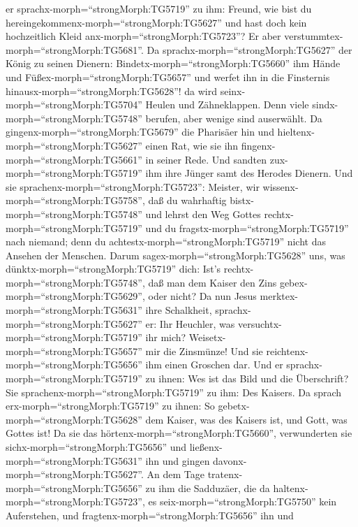 er sprachx-morph=``strongMorph:TG5719'' zu ihm: Freund, wie bist du
hereingekommenx-morph=``strongMorph:TG5627'' und hast doch kein
hochzeitlich Kleid anx-morph=``strongMorph:TG5723''? Er aber
verstummtex-morph=``strongMorph:TG5681''.  Da
sprachx-morph=``strongMorph:TG5627'' der König zu seinen Dienern:
Bindetx-morph=``strongMorph:TG5660'' ihm Hände und
Füßex-morph=``strongMorph:TG5657'' und werfet ihn in die Finsternis
hinausx-morph=``strongMorph:TG5628''! da wird
seinx-morph=``strongMorph:TG5704'' Heulen und Zähneklappen.
 Denn viele sindx-morph=``strongMorph:TG5748'' berufen,
aber wenige sind auserwählt.  Da
gingenx-morph=``strongMorph:TG5679'' die Pharisäer hin und
hieltenx-morph=``strongMorph:TG5627'' einen Rat, wie sie ihn
fingenx-morph=``strongMorph:TG5661'' in seiner Rede.  Und
sandten zux-morph=``strongMorph:TG5719'' ihm ihre Jünger samt des
Herodes Dienern. Und sie sprachenx-morph=``strongMorph:TG5723'':
Meister, wir wissenx-morph=``strongMorph:TG5758'', daß du wahrhaftig
bistx-morph=``strongMorph:TG5748'' und lehrst den Weg Gottes
rechtx-morph=``strongMorph:TG5719'' und du
fragstx-morph=``strongMorph:TG5719'' nach niemand; denn du
achtestx-morph=``strongMorph:TG5719'' nicht das Ansehen der Menschen.
 Darum sagex-morph=``strongMorph:TG5628'' uns, was
dünktx-morph=``strongMorph:TG5719'' dich: Ist's
rechtx-morph=``strongMorph:TG5748'', daß man dem Kaiser den Zins
gebex-morph=``strongMorph:TG5629'', oder nicht?  Da nun
Jesus merktex-morph=``strongMorph:TG5631'' ihre Schalkheit,
sprachx-morph=``strongMorph:TG5627'' er: Ihr Heuchler, was
versuchtx-morph=``strongMorph:TG5719'' ihr mich? 
Weisetx-morph=``strongMorph:TG5657'' mir die Zinsmünze! Und sie
reichtenx-morph=``strongMorph:TG5656'' ihm einen Groschen dar.
 Und er sprachx-morph=``strongMorph:TG5719'' zu ihnen: Wes
ist das Bild und die Überschrift?  Sie
sprachenx-morph=``strongMorph:TG5719'' zu ihm: Des Kaisers. Da sprach
erx-morph=``strongMorph:TG5719'' zu ihnen: So
gebetx-morph=``strongMorph:TG5628'' dem Kaiser, was des Kaisers ist, und
Gott, was Gottes ist!  Da sie das
hörtenx-morph=``strongMorph:TG5660'', verwunderten sie
sichx-morph=``strongMorph:TG5656'' und
ließenx-morph=``strongMorph:TG5631'' ihn und gingen
davonx-morph=``strongMorph:TG5627''.  An dem Tage
tratenx-morph=``strongMorph:TG5656'' zu ihm die Sadduzäer, die da
haltenx-morph=``strongMorph:TG5723'', es
seix-morph=``strongMorph:TG5750'' kein Auferstehen, und
fragtenx-morph=``strongMorph:TG5656'' ihn  und
